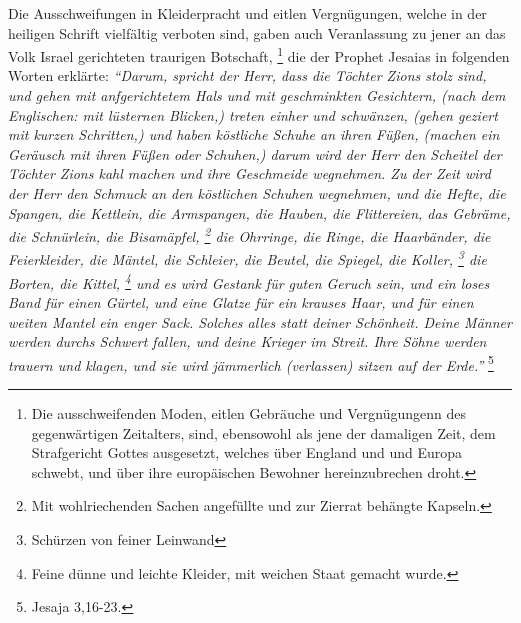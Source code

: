 Die Ausschweifungen in Kleiderpracht und eitlen Vergnügungen, welche in der
heiligen Schrift vielfältig verboten sind, gaben auch
Veranlassung zu jener an
das Volk Israel gerichteten traurigen Botschaft,
\footnote{
    Die ausschweifenden Moden, eitlen Gebräuche und Vergnügungenn des gegenwärtigen
    Zeitalters, sind,
    ebensowohl als jene der damaligen Zeit, dem Strafgericht Gottes ausgesetzt,
    welches über England und und Europa schwebt, und über ihre europäischen
    Bewohner hereinzubrechen droht.}
die der Prophet Jesaias in folgenden Worten erklärte:
\textit{
    "`Darum, spricht der Herr, dass die Töchter Zions stolz sind, und gehen mit anfgerichtetem Hals und mit geschminkten
    Gesichtern, (nach dem Englischen: mit lüsternen Blicken,) treten einher und
    schwänzen, (gehen geziert mit kurzen Schritten,) und haben köstliche Schuhe an
    ihren Füßen, (machen ein Geräusch mit ihren Füßen oder Schuhen,) darum wird der
    Herr den Scheitel der Töchter Zions kahl machen und ihre Geschmeide
    wegnehmen. Zu der Zeit wird der Herr den Schmuck an den köstlichen Schuhen
    wegnehmen, und die Hefte, die Spangen, die Kettlein, die Armspangen, die
    Hauben, die Flittereien, das Gebräme, die Schnürlein, die Bisamäpfel,
    \footnote{
        Mit wohlriechenden Sachen angefüllte und zur Zierrat
        behängte Kapseln.}
    die Ohrringe, die Ringe, die Haarbänder, die Feierkleider,
    die Mäntel, die Schleier, die Beutel, die Spiegel, die Koller,
    \footnote{Schürzen von feiner Leinwand}
    die Borten, die Kittel,
    \footnote{Feine dünne und leichte
        Kleider, mit weichen Staat gemacht wurde.} und es wird Gestank für guten
        Geruch sein, und ein loses Band für einen Gürtel, und eine Glatze für ein
        krauses Haar, und für einen weiten Mantel ein enger Sack. Solches alles
	statt deiner Schönheit. Deine Männer werden durchs Schwert fallen, und deine
	Krieger im Streit. Ihre Söhne werden trauern und klagen, und sie wird
	jämmerlich (verlassen) sitzen auf der Erde."'}
\footnote{Jesaja 3,16-23.}

\medskip

